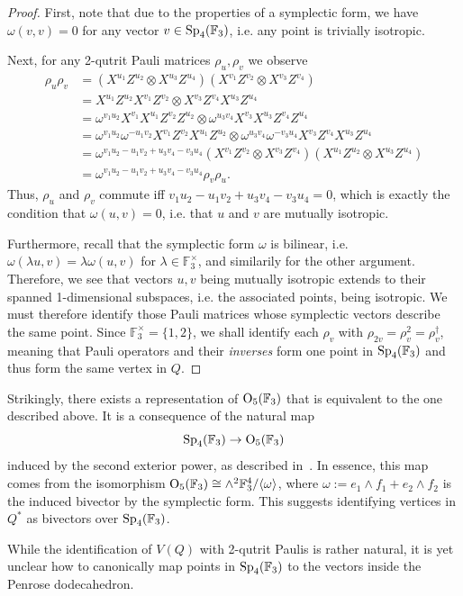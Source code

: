 \begin{proof}
    First, note that due to the properties of a symplectic form, 
    we have $\omega(v, v) = 0$ for any vector $v \in \operatorname{Sp}_4(\mathbb{F}_3)$,
    i.e. any point is trivially isotropic.

    Next, for any 2-qutrit Pauli matrices $\rho_u, \rho_v$ we observe
    \begin{align*}
        \rho_u \rho_v &= (X^{u_1} Z^{u_2} \otimes X^{u_3} Z^{u_4}) (X^{v_1} Z^{v_2} \otimes X^{v_3} Z^{v_4}) \\
        &= X^{u_1} Z^{u_2} X^{v_1} Z^{v_2} \otimes X^{v_3} Z^{v_4} X^{u_3} Z^{u_4} \\
        &= \omega^{v_1 u_2} X^{v_1} X^{u_1} Z^{v_2} Z^{u_2} \otimes \omega^{u_3 v_4} X^{v_3} X^{u_3} Z^{v_4} Z^{u_4} \\
        &= \omega^{v_1 u_2} \omega^{-u_1 v_2} X^{v_1} Z^{v_2} X^{u_1} Z^{u_2} \otimes \omega^{u_3 v_4} \omega^{- v_3 u_4} X^{v_3} Z^{v_4} X^{u_3} Z^{u_4} \\
        &= \omega^{v_1 u_2 - u_1 v_2 + u_3 v_4 - v_3 u_4} (X^{v_1} Z^{v_2} \otimes X^{v_3} Z^{v_4}) (X^{u_1} Z^{u_2} \otimes X^{u_3} Z^{u_4}) \\
        &= \omega^{v_1 u_2 - u_1 v_2 + u_3 v_4 - v_3 u_4} \rho_v \rho_u.
    \end{align*}
    Thus, $\rho_u$ and $\rho_v$ commute iff 
    $v_1 u_2 - u_1 v_2 + u_3 v_4 - v_3 u_4 = 0$, which is exactly the condition that $\omega(u, v) = 0$, i.e. that $u$ and $v$ are mutually isotropic.

    Furthermore, recall that the symplectic form $\omega$ is bilinear, i.e. $\omega(\lambda u, v) = \lambda \omega(u, v)$ for $\lambda \in \mathbb{F}_3^\times$, and similarily for the other argument. 
    Therefore, we see that vectors $u, v$ being mutually isotropic extends to their spanned 1-dimensional subspaces,
    i.e. the associated points, being isotropic. 
    We must therefore identify those Pauli matrices whose symplectic vectors describe the same point.
    Since $\mathbb{F}_3^\times = \{ 1, 2 \}$, we shall identify each
    $\rho_v$ with $\rho_{2v} = \rho_v^2 = \rho_v^\dagger$, 
    meaning that Pauli operators and their \emph{inverses} form one point in $\operatorname{Sp}_4(\mathbb{F}_3)$ and thus 
    form the same vertex in $Q$.
\end{proof}
Strikingly, there exists a representation of $\operatorname{O}_5(\mathbb{F}_3)$ that is equivalent to 
the one described above. It is a consequence of the natural map 
\[ \operatorname{Sp}_4(\mathbb{F}_3) \rightarrow \operatorname{O}_5(\mathbb{F}_3) \]
induced by the second exterior power, as described in~\cite{bonnafé2023uneconstructiondugroupe}.
In essence, this map comes from the isomorphism $\operatorname{O}_5(\mathbb{F}_3) \cong \wedge^2 \mathbb{F}_3^4 / \langle \omega\rangle$, where $\omega := e_1 \wedge f_1 + e_2 \wedge f_2$ is the induced bivector by the symplectic form.
This suggests identifying vertices in $Q^*$ as bivectors over $\operatorname{Sp}_4(\mathbb{F}_3)$.
\begin{remark}
    While the identification of $V(Q)$ with 2-qutrit Paulis is rather natural, it is yet unclear how to 
    canonically map points in $\operatorname{Sp}_4(\mathbb{F}_3)$ to the vectors inside the Penrose dodecahedron.
\end{remark}

